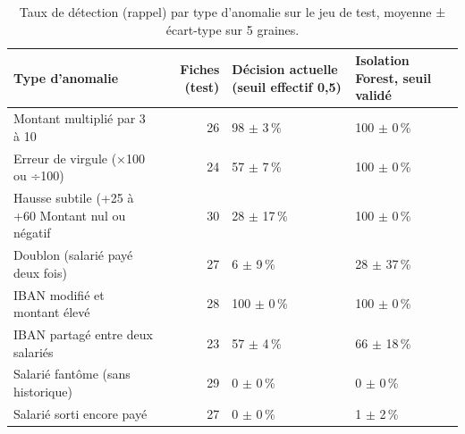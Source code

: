 \begin{table}[htbp]
\centering
\caption{Taux de détection (rappel) par type d'anomalie sur le jeu de test, moyenne ± écart-type sur 5 graines.}
\label{tab:detection_par_type}
\small
\begin{tabular}{p{5cm}rp{3.2cm}p{3.2cm}}
\toprule
\textbf{Type d'anomalie} & \textbf{Fiches (test)} & \textbf{Décision actuelle (seuil effectif 0,5)} & \textbf{Isolation Forest, seuil validé} \\
\midrule
Montant multiplié par 3 à 10 & 26 & 98 $\pm$ 3\,\% & 100 $\pm$ 0\,\% \\
Erreur de virgule (×100 ou ÷100) & 24 & 57 $\pm$ 7\,\% & 100 $\pm$ 0\,\% \\
Hausse subtile (+25 à +60 %
Montant nul ou négatif & 30 & 28 $\pm$ 17\,\% & 100 $\pm$ 0\,\% \\
Doublon (salarié payé deux fois) & 27 & 6 $\pm$ 9\,\% & 28 $\pm$ 37\,\% \\
IBAN modifié et montant élevé & 28 & 100 $\pm$ 0\,\% & 100 $\pm$ 0\,\% \\
IBAN partagé entre deux salariés & 23 & 57 $\pm$ 4\,\% & 66 $\pm$ 18\,\% \\
Salarié fantôme (sans historique) & 29 & 0 $\pm$ 0\,\% & 0 $\pm$ 0\,\% \\
Salarié sorti encore payé & 27 & 0 $\pm$ 0\,\% & 1 $\pm$ 2\,\% \\
\bottomrule
\end{tabular}
\end{table}
